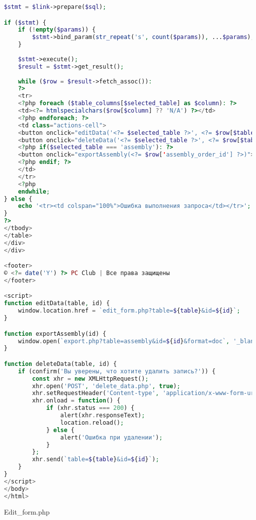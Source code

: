 \begin{lstlisting}[language=Php, frame=none]
$stmt = $link->prepare($sql);

if ($stmt) {
	if (!empty($params)) {
		$stmt->bind_param(str_repeat('s', count($params)), ...$params);
	}
	
	$stmt->execute();
	$result = $stmt->get_result();
	
	while ($row = $result->fetch_assoc()):
	?>
	<tr>
	<?php foreach ($table_columns[$selected_table] as $column): ?>
	<td><?= htmlspecialchars($row[$column] ?? 'N/A') ?></td>
	<?php endforeach; ?>
	<td class="actions-cell">
	<button onclick="editData('<?= $selected_table ?>', <?= $row[$table_columns[$selected_table][0]] ?>)">✏️</button>
	<button onclick="deleteData('<?= $selected_table ?>', <?= $row[$table_columns[$selected_table][0]] ?>)">🗑️</button>
	<?php if($selected_table === 'assembly'): ?>
	<button onclick="exportAssembly(<?= $row['assembly_order_id'] ?>)">📤 Экспорт</button>
	<?php endif; ?>
	</td>
	</tr>
	<?php
	endwhile;
} else {
	echo '<tr><td colspan="100%">Ошибка выполнения запроса</td></tr>';
}
?>
</tbody>
</table>
</div>
</div>

<footer>
© <?= date('Y') ?> PC Club | Все права защищены
</footer>

<script>
function editData(table, id) {
	window.location.href = `edit_form.php?table=${table}&id=${id}`;
}

function exportAssembly(id) {
	window.open(`export.php?table=assembly&id=${id}&format=doc`, '_blank');
}

function deleteData(table, id) {
	if (confirm('Вы уверены, что хотите удалить запись?')) {
		const xhr = new XMLHttpRequest();
		xhr.open('POST', 'delete_data.php', true);
		xhr.setRequestHeader('Content-type', 'application/x-www-form-urlencoded');
		xhr.onload = function() {
			if (xhr.status === 200) {
				alert(xhr.responseText);
				location.reload();
			} else {
				alert('Ошибка при удалении');
			}
		};
		xhr.send(`table=${table}&id=${id}`);
	}
}
</script>
</body>
</html>
\end{lstlisting}

Edit\_form.php


